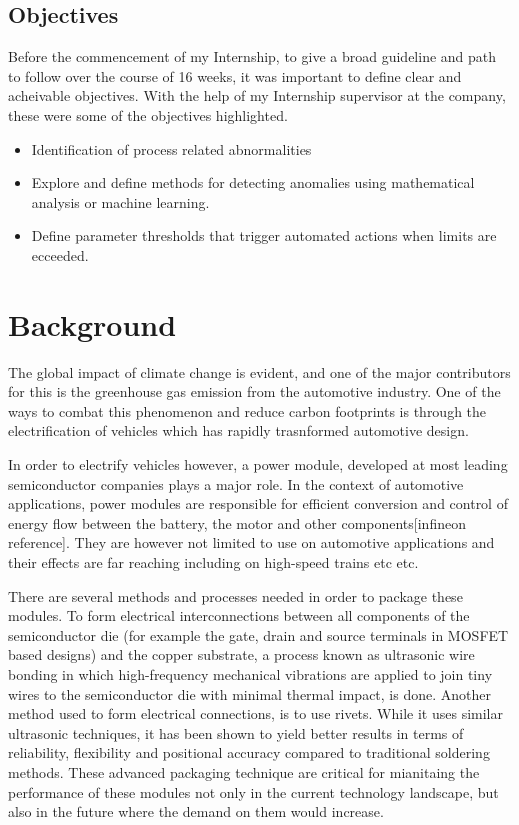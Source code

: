 \documentclass{article}
\begin{document}
\subsection{Objectives}
Before the commencement of my Internship, to give a broad guideline and path to follow over the course of 16 weeks, it was important to define clear and acheivable objectives. With the help of my Internship supervisor at the company, these were some of the objectives highlighted.
\begin{itemize}
    \item Identification of process related abnormalities
    \item Explore and define methods for detecting anomalies using mathematical analysis or machine learning.
    \item Define parameter thresholds that trigger automated actions when limits are ecceeded.
\end{itemize}

\section{Background}
The global impact of climate change is evident, and one of the major contributors for this is the greenhouse gas emission from the automotive industry. One of the ways to combat this phenomenon and reduce carbon footprints is through the electrification of vehicles which has rapidly trasnformed automotive design.

In order to electrify vehicles however, a power module, developed at most leading semiconductor companies plays a major role. In the context of automotive applications, power modules are responsible for efficient conversion and control of energy flow between the battery, the motor and other components[infineon reference]. They are however not limited to use on automotive applications and their effects are far reaching including on high-speed trains etc etc.

There are several methods and processes needed in order to package these modules. 
To form electrical interconnections between all components of the semiconductor die (for example the gate, drain and source terminals in MOSFET based designs) and the copper substrate, a process known as ultrasonic wire bonding in which high-frequency mechanical vibrations are applied to join tiny wires to the semiconductor die with minimal thermal impact, is done.
Another method used to form electrical connections, is to use rivets. While it uses similar ultrasonic techniques, it has been shown to yield better results in terms of reliability, flexibility and positional accuracy compared to traditional soldering methods. 
These advanced packaging technique are critical for mianitaing the performance of these modules not only in the current technology landscape, but also in the future where the demand on them would increase.
\end{document}

